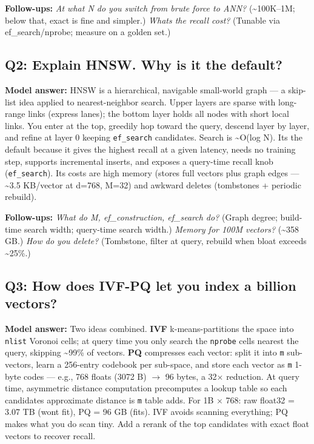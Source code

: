 \documentclass[11pt]{article}
\begin{document}
\textbf{Follow-ups:} \emph{At what N do you switch from brute force to ANN?} (\textasciitilde100K--1M; below that, exact is fine and simpler.) \emph{What\textquotesingle s the recall cost?} (Tunable via ef\_search/nprobe; measure on a golden set.)

\subsection{Q2: Explain HNSW. Why is it the default?}\label{q2-explain-hnsw-why-is-it-the-default}

\textbf{Model answer:} HNSW is a hierarchical, navigable small-world graph --- a skip-list idea applied to nearest-neighbor search. Upper layers are sparse with long-range links (express lanes); the bottom layer holds all nodes with short local links. You enter at the top, greedily hop toward the query, descend layer by layer, and refine at layer 0 keeping \texttt{ef\_search} candidates. Search is \textasciitilde O(log N). It\textquotesingle s the default because it gives the highest recall at a given latency, needs no training step, supports incremental inserts, and exposes a query-time recall knob (\texttt{ef\_search}). Its costs are high memory (stores full vectors plus graph edges --- \textasciitilde3.5 KB/vector at d=768, M=32) and awkward deletes (tombstones + periodic rebuild).

\textbf{Follow-ups:} \emph{What do M, ef\_construction, ef\_search do?} (Graph degree; build-time search width; query-time search width.) \emph{Memory for 100M vectors?} (\textasciitilde358 GB.) \emph{How do you delete?} (Tombstone, filter at query, rebuild when bloat exceeds \textasciitilde25\%.)

\subsection{Q3: How does IVF-PQ let you index a billion vectors?}\label{q3-how-does-ivf-pq-let-you-index-a-billion-vectors}

\textbf{Model answer:} Two ideas combined. \textbf{IVF} k-means-partitions the space into \texttt{nlist} Voronoi cells; at query time you only search the \texttt{nprobe} cells nearest the query, skipping \textasciitilde99\% of vectors. \textbf{PQ} compresses each vector: split it into \texttt{m} sub-vectors, learn a 256-entry codebook per sub-space, and store each vector as \texttt{m} 1-byte codes --- e.g., 768 floats (3072 B) \(\rightarrow\) 96 bytes, a 32\(\times\) reduction. At query time, asymmetric distance computation precomputes a lookup table so each candidate\textquotesingle s approximate distance is \texttt{m} table adds. For 1B \(\times\) 768: raw float32 = 3.07 TB (won\textquotesingle t fit), PQ = 96 GB (fits). IVF avoids scanning everything; PQ makes what you do scan tiny. Add a rerank of the top candidates with exact float vectors to recover recall.
\end{document}
